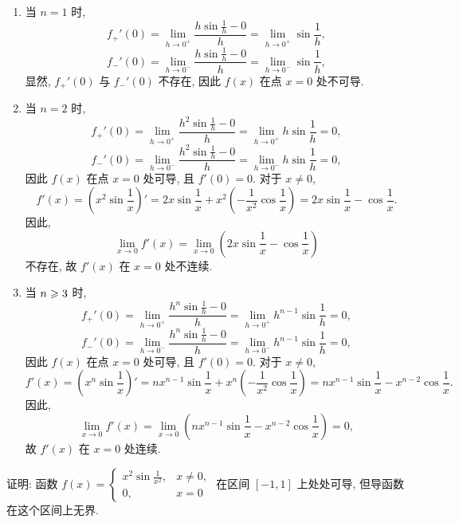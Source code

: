 \begin{solution}
    \begin{enumerate}
        \item 当 $n=1$ 时, $$f_+'(0) = \lim_{h \to 0^+} \frac{h \sin \frac{1}{h} - 0}{h} = \lim_{h \to 0^+} \sin \frac{1}{h},$$
              $$f_-'(0) = \lim_{h \to 0^-} \frac{h \sin \frac{1}{h} - 0}{h} = \lim_{h \to 0^-} \sin \frac{1}{h},$$
              显然, $f_+'(0)$ 与 $f_-'(0)$ 不存在, 因此 $f(x)$ 在点 $x=0$ 处不可导.
        \item 当 $n=2$ 时, $$f_+'(0) = \lim_{h \to 0^+} \frac{h^2 \sin \frac{1}{h} - 0}{h} = \lim_{h \to 0^+} h \sin \frac{1}{h} = 0,$$
              $$f_-'(0) = \lim_{h \to 0^-} \frac{h^2 \sin \frac{1}{h} - 0}{h} = \lim_{h \to 0^-} h \sin \frac{1}{h} = 0,$$
              因此 $f(x)$ 在点 $x=0$ 处可导, 且 $f'(0) = 0$. 对于 $x \ne 0$, $$f'(x) = (x^2 \sin \frac{1}{x})' = 2x \sin \frac{1}{x} + x^2 \left( -\frac{1}{x^2} \cos \frac{1}{x} \right) = 2x \sin \frac{1}{x} - \cos \frac{1}{x}.$$
              因此, $$\lim_{x \to 0} f'(x) = \lim_{x \to 0} (2x \sin \frac{1}{x} - \cos \frac{1}{x})$$ 不存在, 故 $f'(x)$ 在 $x=0$ 处不连续.
        \item 当 $n \geqslant 3$ 时, $$f_+'(0) = \lim_{h \to 0^+} \frac{h^n \sin \frac{1}{h} - 0}{h} = \lim_{h \to 0^+} h^{n-1} \sin \frac{1}{h} = 0,$$
              $$f_-'(0) = \lim_{h \to 0^-} \frac{h^n \sin \frac{1}{h} - 0}{h} = \lim_{h \to 0^-} h^{n-1} \sin \frac{1}{h} = 0,$$
              因此 $f(x)$ 在点 $x=0$ 处可导, 且 $f'(0) = 0$. 对于 $x \ne 0$, $$f'(x) = (x^n \sin \frac{1}{x})' = n x^{n-1} \sin \frac{1}{x} + x^n \left( -\frac{1}{x^2} \cos \frac{1}{x} \right) = n x^{n-1} \sin \frac{1}{x} - x^{n-2} \cos \frac{1}{x}.$$
              因此, $$\lim_{x \to 0} f'(x) = \lim_{x \to 0} (n x^{n-1} \sin \frac{1}{x} - x^{n-2} \cos \frac{1}{x}) = 0,$$ 故 $f'(x)$ 在 $x=0$ 处连续. 
    \end{enumerate}
\end{solution}

\begin{exercise}[3.1.13]
    证明: 函数 $f(x) = \begin{cases} x^2\sin\frac{1}{x^2}, & x \ne 0, \\ 0, & x=0 \end{cases}$ 在区间 $[-1,1]$ 上处处可导, 但导函数在这个区间上无界.
\end{exercise}

